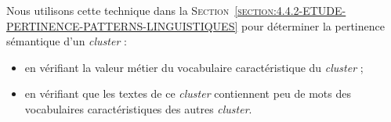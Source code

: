 		\begin{leftBarAuthorOpinion}
			Nous utilisons cette technique dans la \textsc{Section~\ref{section:4.4.2-ETUDE-PERTINENCE-PATTERNS-LINGUISTIQUES}} pour déterminer la pertinence sémantique d'un \textit{cluster} :
			\begin{itemize}
				\item en vérifiant la valeur métier du vocabulaire caractéristique du \textit{cluster} ;
				\item en vérifiant que les textes de ce \textit{cluster} contiennent peu de mots des vocabulaires caractéristiques des autres \textit{cluster}.
			\end{itemize}
		\end{leftBarAuthorOpinion}